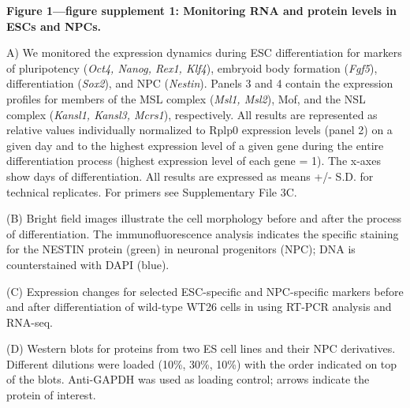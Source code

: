 \begin{footnotesize}
\begin{sffamily}
\begin{singlespacing}

%
\textbf{Figure 1—figure supplement 1: Monitoring RNA and protein levels in ESCs and NPCs.
}

A) We monitored the expression dynamics during ESC differentiation for markers of pluripotency (\textit{Oct4, Nanog, Rex1, Klf4}), embryoid body formation (\textit{Fgf5}), differentiation (\textit{Sox2}), and NPC (\textit{Nestin}). Panels 3 and 4 contain the expression profiles for members of the MSL complex (\textit{Msl1, Msl2}), Mof, and the NSL complex (\textit{Kansl1, Kansl3, Mcrs1}), respectively. All results are represented as relative values individually normalized to Rplp0 expression levels (panel 2) on a given day and to the highest expression level of a given gene during the entire differentiation process (highest expression level of each gene = 1). The x-axes show days of differentiation. All results are expressed as means +/- S.D. for technical replicates. For primers see Supplementary File 3C.

(B) Bright field images illustrate the cell morphology before and after the process of differentiation. The im\-mu\-no\-fluo\-res\-cence analysis indicates the specific staining for the NESTIN protein (green) in neuronal progenitors (NPC); DNA is counter\-stained with DAPI (blue).

(C) Expression changes for selected ESC-specific and NPC-specific markers before and after differentiation of wild-type WT26 cells in using RT-PCR analysis and RNA-seq.

(D) Western blots for proteins from two ES cell lines and their NPC derivatives. Different dilutions were loaded (10\%, 30\%, 10\%) with the order indicated on top of the blots. Anti-GAPDH was used as loading control; arrows indicate the protein of interest.


\end{singlespacing}
\end{sffamily}
\end{footnotesize}
